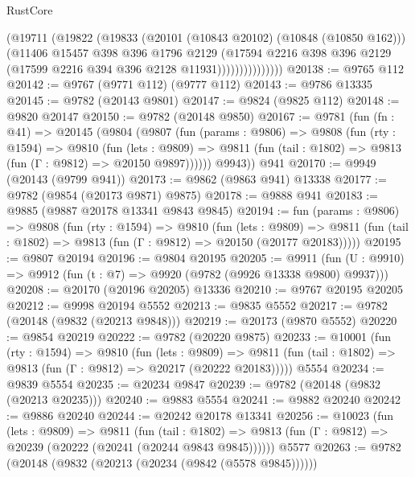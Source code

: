 \begin{lexlean}{RustCore}
\begin{coremodule}
                      (@19711
                        (@19822
                          (@19833
                            (@20101 (@10843 @20102) (@10848 (@10850 @162)))
                            (@11406
                              @15457
                              @398
                              @396
                              @1796
                              @2129
                              (@17594
                                @2216
                                @398
                                @396
                                @2129
                                (@17599 @2216 @394 @396 @2128 @11931)))))))))))))))
@20138 := @9765 @112
@20142 := @9767 (@9771 @112) (@9777 @112)
@20143 := @9786 @13335
@20145 := @9782 (@20143 @9801)
@20147 := @9824 (@9825 @112)
@20148 := @9820 @20147
@20150 := @9782 (@20148 @9850)
@20167 := @9781
    (fun (fn : @41) =>
    @20145
      (@9804
        (@9807
          (fun (params : @9806) =>
          @9808
            (fun (rty : @1594) =>
            @9810
              (fun (lets : @9809) =>
              @9811 (fun (tail : @1802) => @9813 (fun (Γ : @9812) => @20150 @9897))))))
        @9943))
    @941
@20170 := @9949 (@20143 (@9799 @941))
@20173 := @9862 (@9863 @941) @13338
@20177 := @9782 (@9854 (@20173 @9871) @9875)
@20178 := @9888 @941
@20183 := @9885 (@9887 @20178 @13341 @9843 @9845)
@20194 := fun (params : @9806) =>
  @9808
    (fun (rty : @1594) =>
    @9810
      (fun (lets : @9809) =>
      @9811 (fun (tail : @1802) => @9813 (fun (Γ : @9812) => @20150 (@20177 @20183)))))
@20195 := @9807 @20194
@20196 := @9804 @20195
@20205 := @9911
    (fun (U : @9910) => @9912 (fun (t : @7) => @9920 (@9782 (@9926 @13338 @9800) @9937)))
@20208 := @20170 (@20196 @20205) @13336
@20210 := @9767 @20195 @20205
@20212 := @9998 @20194 @5552
@20213 := @9835 @5552
@20217 := @9782 (@20148 (@9832 (@20213 @9848)))
@20219 := @20173 (@9870 @5552)
@20220 := @9854 @20219
@20222 := @9782 (@20220 @9875)
@20233 := @10001
    (fun (rty : @1594) =>
    @9810
      (fun (lets : @9809) =>
      @9811 (fun (tail : @1802) => @9813 (fun (Γ : @9812) => @20217 (@20222 @20183)))))
    @5554
@20234 := @9839 @5554
@20235 := @20234 @9847
@20239 := @9782 (@20148 (@9832 (@20213 @20235)))
@20240 := @9883 @5554
@20241 := @9882 @20240
@20242 := @9886 @20240
@20244 := @20242 @20178 @13341
@20256 := @10023
    (fun (lets : @9809) =>
    @9811
      (fun (tail : @1802) =>
      @9813 (fun (Γ : @9812) => @20239 (@20222 (@20241 (@20244 @9843 @9845))))))
    @5577
@20263 := @9782 (@20148 (@9832 (@20213 (@20234 (@9842 (@5578 @9845))))))

\end{coremodule}
\end{lexlean}
